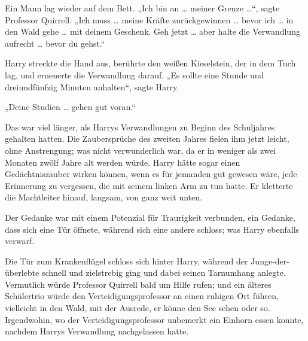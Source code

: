 Ein Mann lag wieder auf dem Bett.
„Ich bin an … meiner Grenze …“, sagte Professor Quirrell.
„Ich muss … meine Kräfte zurückgewinnen … bevor ich … in den Wald gehe … mit deinem Geschenk. Geh jetzt … aber halte die Verwandlung aufrecht … bevor du gehst.“

Harry streckte die Hand aus, berührte den weißen Kieselstein, der in dem Tuch lag, und erneuerte die Verwandlung darauf.
„Es sollte eine Stunde und dreiundfünfzig Minuten anhalten“, sagte Harry.

„Deine Studien … gehen gut voran.“

Das war viel länger, als Harrys Verwandlungen zu Beginn des Schuljahres gehalten hatten. Die Zaubersprüche des zweiten Jahres fielen ihm jetzt leicht, ohne Anstrengung; was nicht verwunderlich war, da er in weniger als zwei Monaten zwölf Jahre alt werden würde. Harry hätte sogar einen Gedächtniszauber wirken können, wenn es für jemanden gut gewesen wäre, jede Erinnerung zu vergessen, die mit seinem linken Arm zu tun hatte. Er kletterte die Machtleiter hinauf, langsam, von ganz weit unten.

Der Gedanke war mit einem Potenzial für Traurigkeit verbunden, ein Gedanke, dass sich eine Tür öffnete, während sich eine andere schloss; was Harry ebenfalls verwarf.

\later

Die Tür zum Krankenflügel schloss sich hinter Harry, während der Junge-der-überlebte schnell und zielstrebig ging und dabei seinen Tarnumhang anlegte. Vermutlich würde Professor Quirrell bald um Hilfe rufen; und ein älteres Schülertrio würde den Verteidigungsprofessor an einen ruhigen Ort führen, vielleicht in den Wald, mit der Ausrede, er könne den See sehen oder so. Irgendwohin, wo der Verteidigungsprofessor unbemerkt ein Einhorn essen konnte, nachdem Harrys Verwandlung nachgelassen hatte.


